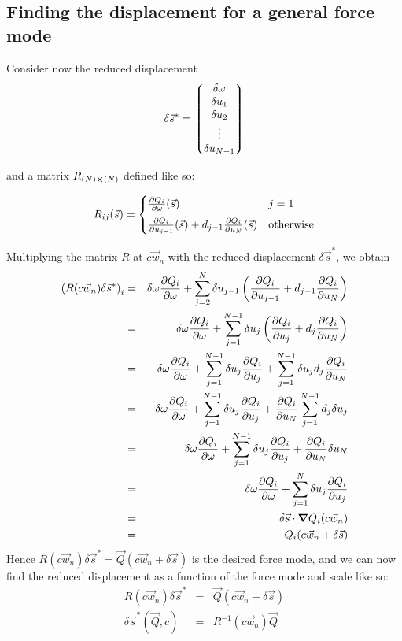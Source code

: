 \documentclass[12pt]{article}
\begin{document}
  \subsection{Finding the displacement for a general force mode}
  
  Consider now the reduced displacement
  $$\delta \vec{s}^*=\mqty*(\delta \omega \\ \delta u_1 \\ \delta u_2 \\ \vdots \\ \delta u_{N-1})$$
  
  and a matrix $R_{(N)\cross (N)}$ defined like so:
  
  $$R_{ij}(\vec{s}) = \begin{cases}
  
	\pdv{Q_i}{\omega}()(\vec{s}) & j = 1 \\[5pt]
     
    \pdv{Q_i}{u_{j-1}}()(\vec{s}) + d_{j-1} \pdv{Q_i}{u_N}()(\vec{s}) & \mbox{otherwise}
  
  \end{cases}$$
  
  Multiplying the matrix $R$ at $c\vec{w}_n$ with the reduced displacement $\delta \vec{s}^*$, we obtain
  \begin{eqnarray*}
  \left(R(c\vec{w}_n)\delta \vec{s}^*\right)_i&=&\delta \omega\pdv{Q_i}{\omega} + \sum_{j = 2}^N \delta u_{j-1} \left( \pdv{Q_i}{u_{j-1}} + d_{j-1} \pdv{Q_i}{u_N} \right)\\
  &=&\delta \omega\pdv{Q_i}{\omega} + \sum_{j = 1}^{N-1} \delta u_j \left( \pdv{Q_i}{u_j} + d_j \pdv{Q_i}{u_N} \right)\\
  &=&\delta \omega\pdv{Q_i}{\omega} + \sum_{j = 1}^{N-1} \delta u_j \pdv{Q_i}{u_j} + \sum_{j = 1}^{N-1} \delta u_j d_j \pdv{Q_i}{u_N}\\
  &=&\delta \omega\pdv{Q_i}{\omega} + \sum_{j = 1}^{N-1} \delta u_j \pdv{Q_i}{u_j} + \pdv{Q_i}{u_N} \sum_{j = 1}^{N-1} d_j  \delta u_j\\
  &=&\delta \omega\pdv{Q_i}{\omega} + \sum_{j = 1}^{N-1} \delta u_j \pdv{Q_i}{u_j} + \pdv{Q_i}{u_N} \delta u_N\\
  &=&\delta \omega\pdv{Q_i}{\omega} + \sum_{j = 1}^{N} \delta u_j \pdv{Q_i}{u_j}\\
  &=& \delta \vec{s}\cdot \grad{Q_i}(c\vec{w}_n)\\
  &=& Q_i(c\vec{w}_n + \delta\vec{s})
  \end{eqnarray*}
  Hence $R(c\vec{w}_n)\delta \vec{s}^* = \vec{Q}(c\vec{w}_n + \delta\vec{s})$ is the desired force mode, and we can now find the reduced displacement as a function of the force mode and scale like so:
  \begin{eqnarray*}
  R(c\vec{w}_n)\delta \vec{s}^* &=& \vec{Q}(c\vec{w}_n + \delta\vec{s})\\
  \delta \vec{s}^*(\vec{Q}, c) &=& R^{-1}(c\vec{w}_n) \vec{Q}
  \end{eqnarray*}
  
\end{document}
